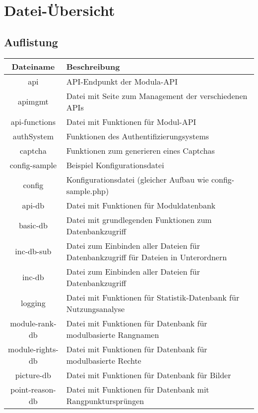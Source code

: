 \chapter{Datei-Übersicht}
\section{Auflistung}
\begin{longtable}[H]{|c|p{10cm}|}
	\hline
	\textbf{Dateiname} & \textbf{Beschreibung} \\ \hline
	api                          & API-Endpunkt der Modula-API \\ \hline
	apimgmt                      & Datei mit Seite zum Management der verschiedenen APIs \\ \hline
	api-functions                & Datei mit Funktionen für Modul-API \\ \hline
	authSystem                   & Funktionen des Authentifizierungsystems \\ \hline
	captcha                      & Funktionen zum generieren eines Captchas \\ \hline
	config-sample                & Beispiel Konfigurationsdatei \\ \hline
	config                       & Konfigurationsdatei (gleicher Aufbau wie config-sample.php) \\ \hline
	api-db                       & Datei mit Funktionen für Moduldatenbank \\ \hline
	basic-db                     & Datei mit grundlegenden Funktionen zum Datenbankzugriff \\ \hline
	inc-db-sub                   & Datei zum Einbinden aller Dateien für Datenbankzugriff für Dateien in Unterordnern \\ \hline
	inc-db                       & Datei zum Einbinden aller Dateien für Datenbankzugriff \\ \hline
	logging                      & Datei mit Funktionen für Statistik-Datenbank für Nutzungsanalyse \\ \hline
	module-rank-db               & Datei mit Funktionen für Datenbank für modulbasierte Rangnamen \\ \hline
	module-rights-db             & Datei mit Funktionen für Datenbank für modulbasierte Rechte \\ \hline
	picture-db                   & Datei mit Funktionen für Datenbank für Bilder \\ \hline
	point-reason-db              & Datei mit Funktionen für Datenbank mit Rangpunktursprüngen \\ \hline

\end{longtable}
